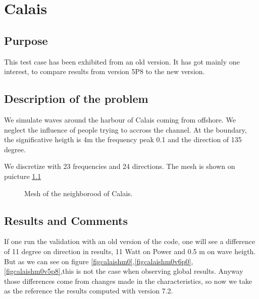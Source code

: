 \chapter{Calais}
%
%
\section{Purpose}
%
This test case has been exhibited from an old version. It has got mainly one interest, to compare results from version 5P8 to the new version.  

%
\section{Description of the problem}
We simulate waves around the harbour of Calais coming from offshore. We neglect the influence of people trying to accross the channel.
At the boundary, the significative heigth is 4m the frequency peak 0.1 and the direction of 135 degree.

We discretize with 23 frequencies and 24 directions. The mesh is shown on puicture \ref{figcalaismesh}

\begin{figure} [!h]
\centering
{}
 \caption{Mesh of the neighborood of Calais. }
\label{figcalaismesh}
\end{figure}

\section{Results and Comments}

If one run the validation with an old version of the code, one will see a difference of 11 degree on direction in results, 11 Watt on Power and 0.5 m on wave heigth. But as we can see on figure  \ref{figcalaishm0},\ref{figcalaishm0v6p0}, \ref{figcalaishm0v5p8},this is not the case when observing global results. Anyway those differences come from changes made in the characteristics, so now we take as the reference the results computed with version 7.2. 

